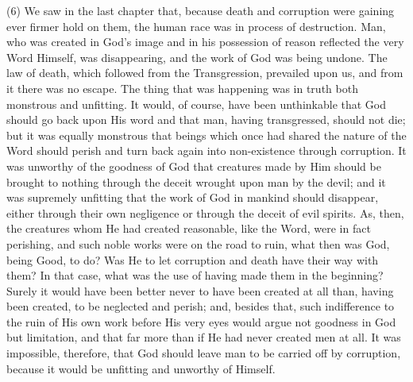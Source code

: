 \documentclass[9pt, twocolumn, oneside, a4paper]{memoir}
\begin{document}
\textsc{(6)} We saw in the last chapter that, because death and       corruption were gaining ever firmer hold on them, the human race was in process       of destruction. Man, who was created in God's image and in his possession of       reason reflected the very Word Himself, was disappearing, and the work of God       was being undone. The law of death, which followed from the Transgression,       prevailed upon us, and from it there was no escape. The thing that was happening       was in truth both monstrous and unfitting. It would, of course, have been       unthinkable that God should go back upon His word and that man, having       transgressed, should not die; but it was equally monstrous that beings which       once had shared the nature of the Word should perish and turn back again into       non-existence through corruption. It was unworthy of the goodness of God that       creatures made by Him should be brought to nothing through the deceit wrought       upon man by the devil; and it was supremely unfitting that the work of God in       mankind should disappear, either through their own negligence or through the       deceit of evil spirits. As, then, the creatures whom He had created reasonable,       like the Word, were in fact perishing, and such noble works were on the road to       ruin, what then was God, being Good, to do? Was He to let corruption and death       have their way with them? In that case, what was the use of having made them in       the beginning? Surely it would have been better never to have been created at       all than, having been created, to be neglected and perish; and, besides that,       such indifference to the ruin of His own work before His very eyes would argue       not goodness in God but limitation, and that far more than if He had never       created men at all. It was impossible, therefore, that God should leave man to       be carried off by corruption, because it would be unfitting and unworthy of       Himself.   
\end{document}
